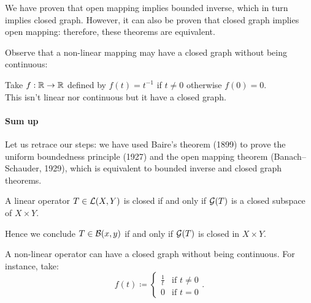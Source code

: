 We have proven that open mapping implies bounded inverse, which in turn implies closed graph. However, it can also be proven that closed graph implies open mapping: therefore, these theorems are equivalent.

Observe that a non-linear mapping may have a closed graph without being continuous:
\begin{exam}
	Take $f: \mathbb R \to \mathbb R$ defined by $f(t)=t^{-1}$ if $t \neq 0$ otherwise $f(0) = 0$.\\
	This isn't linear nor continuous but it have a closed graph.
\end{exam}

\paragraph{Sum up} Let us retrace our steps: we have used Baire's theorem (1899) to prove the uniform boundedness principle (1927) and the open mapping theorem (Banach–Schauder, 1929), which is equivalent to bounded inverse and closed graph theorems.

\begin{prop}
	A linear operator $T\in \mathcal L(X,Y)$ is closed if and only if $\mathcal G(T)$ is a closed subspace of $X \times Y$.
\end{prop}

Hence we conclude 
$T\in \mathcal B(x,y)$ if and only if $\mathcal G(T)$ is closed in $X\times Y$.

\begin{exam}
	A non-linear operator can have a closed graph without being continuous. For instance, take:
	$$f(t) \coloneqq \begin{cases}
	\frac 1 t & \text{if } t \neq 0 \\
	0 & \text{if } t=0
	\end{cases}
	.
	$$
\end{exam}

%	
%	
%	
